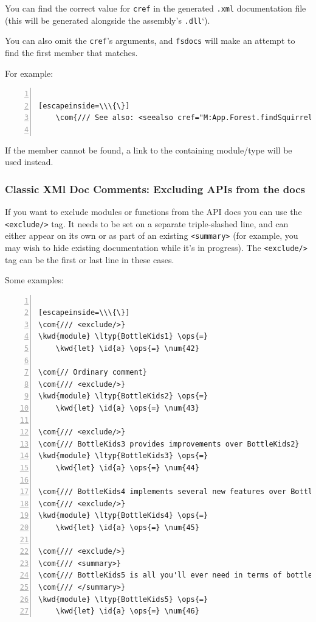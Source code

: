 \documentclass{article}
\newcommand{\id}[1]{\textcolor{black}{#1}}
\newcommand{\com}[1]{\textcolor{officegreen}{#1}}
\newcommand{\kwd}[1]{\textcolor{navy}{#1}}
\newcommand{\num}[1]{\textcolor{officegreen}{#1}}
\newcommand{\ops}[1]{\textcolor{purple}{#1}}
\begin{document}
You can find the correct value for \texttt{cref} in the generated \texttt{.xml} documentation file (this will be generated alongside the assembly's \texttt{.dll}`).


You can also omit the \texttt{cref}'s arguments, and \texttt{fsdocs} will make an attempt to find the first member that matches.


For example:
\begin{lstlisting}[numbers=left]

[escapeinside=\\\{\}]
    \com{/// See also: <seealso cref="M:App.Forest.findSquirrels"/>}


\end{lstlisting}



If the member cannot be found, a link to the containing module/type will be used instead.
\subsubsection*{Classic XMl Doc Comments: Excluding APIs from the docs}



If you want to exclude modules or functions from the API docs you can use the \texttt{<exclude/>} tag.
It needs to be set on a separate triple-slashed line, and can either appear on its own or as part
of an existing \texttt{<summary>} (for example, you may wish to hide existing documentation while it's in progress).
The \texttt{<exclude/>} tag can be the first or last line in these cases.


Some examples:
\begin{lstlisting}[numbers=left]

[escapeinside=\\\{\}]
\com{/// <exclude/>}
\kwd{module} \ltyp{BottleKids1} \ops{=}
    \kwd{let} \id{a} \ops{=} \num{42}

\com{// Ordinary comment}
\com{/// <exclude/>}
\kwd{module} \ltyp{BottleKids2} \ops{=}
    \kwd{let} \id{a} \ops{=} \num{43}

\com{/// <exclude/>}
\com{/// BottleKids3 provides improvements over BottleKids2}
\kwd{module} \ltyp{BottleKids3} \ops{=}
    \kwd{let} \id{a} \ops{=} \num{44}

\com{/// BottleKids4 implements several new features over BottleKids3}
\com{/// <exclude/>}
\kwd{module} \ltyp{BottleKids4} \ops{=}
    \kwd{let} \id{a} \ops{=} \num{45}

\com{/// <exclude/>}
\com{/// <summary>}
\com{/// BottleKids5 is all you'll ever need in terms of bottles or kids.}
\com{/// </summary>}
\kwd{module} \ltyp{BottleKids5} \ops{=}
    \kwd{let} \id{a} \ops{=} \num{46}

\end{lstlisting}
\end{document}
